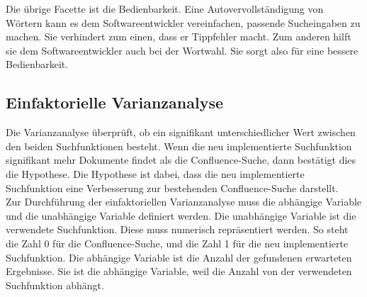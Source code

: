 Die übrige Facette ist die Bedienbarkeit.
Eine Autovervollständigung von Wörtern kann es dem Softwareentwickler vereinfachen, passende Sucheingaben zu machen.
Sie verhindert zum einen, dass er Tippfehler macht.
Zum anderen hilft sie dem Softwareentwickler auch bei der Wortwahl.
Sie sorgt also für eine bessere Bedienbarkeit.\\



\subsection{Einfaktorielle Varianzanalyse}
Die Varianzanalyse überprüft, ob ein signifikant unterschiedlicher Wert zwischen den beiden Suchfunktionen besteht.
Wenn die neu implementierte Suchfunktion signifikant mehr Dokumente findet als die Confluence-Suche, dann bestätigt dies die Hypothese.
Die Hypothese ist dabei, dass die neu implementierte Suchfunktion eine Verbesserung zur bestehenden Confluence-Suche darstellt.\\

Zur Durchführung der einfaktoriellen Varianzanalyse muss die abhängige Variable und die unabhängige Variable definiert werden.
Die unabhängige Variable ist die verwendete Suchfunktion.
Diese muss numerisch repräsentiert werden.
So steht die Zahl 0 für die Confluence-Suche, und die Zahl 1 für die neu implementierte Suchfunktion.
Die abhängige Variable ist die Anzahl der gefundenen erwarteten Ergebnisse.
Sie ist die abhängige Variable, weil die Anzahl von der verwendeten Suchfunktion abhängt.


